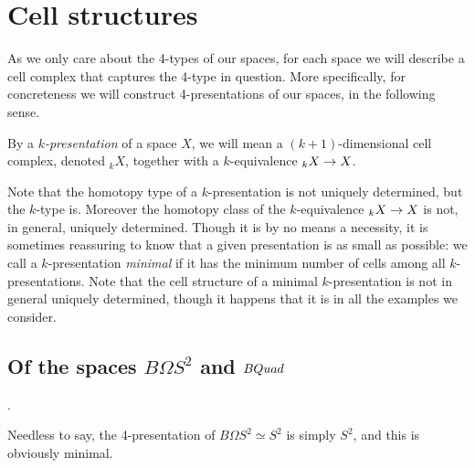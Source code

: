 \documentclass{amsart}
\begin{document}


\section{Cell structures}


As we only care about the 4-types of our spaces, for each space we will describe a cell complex that captures the 4-type in question.  More specifically, for concreteness we will construct 4-presentations of our spaces, in the following sense.

\begin{definition}
By a \emph{$k$-presentation} of a space $X$, we will mean a $(k+1)$-dimensional cell complex, denoted $_k X$, together with a $k$-equivalence $_{k} X \rightarrow X$.
\end{definition}
\nid Note that the homotopy type of a $k$-presentation is not uniquely determined, but the $k$-type is.  Moreover the homotopy class of the $k$-equivalence $_k X \rightarrow X$ is not, in general, uniquely determined.  Though it is by no means a necessity, it is sometimes reassuring to know that a given presentation is as small as possible: we call a $k$-presentation \emph{minimal} if it has the minimum number of cells among all $k$-presentations.  Note that the cell structure of a minimal $k$-presentation is not in general uniquely determined, though it happens that it is in all the examples we consider.


\subsection{Of the spaces $B\Omega S^2$ and $BQuad$}.

Needless to say, the 4-presentation of $B\Omega S^2 \simeq S^2$ is simply $S^2$, and this is obviously minimal. 
\end{document}
